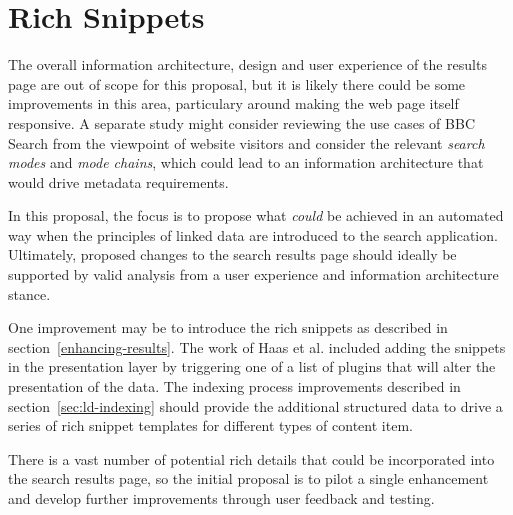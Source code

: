 \section{Rich Snippets}

The overall information architecture, design and user experience of
the results page are out of scope for this proposal, but it is likely
there could be some improvements in this area, particulary around making
the web page itself responsive\cite{marcotte2010responsive}. A separate
study might consider reviewing the use cases of BBC Search from
the viewpoint of website visitors and consider the relevant
\emph{search modes} and \emph{mode chains}, which could lead to
an information architecture that would drive metadata requirements.

In this proposal, the focus is to propose what \emph{could} be
achieved in an automated way when the principles of linked data
are introduced to the search application. Ultimately, proposed
changes to the search results page should ideally be supported
by valid analysis from a user experience and information
architecture stance.

One improvement may be to introduce the rich snippets as described
in section~\ref{enhancing-results}. The work of Haas et
al.\cite{haas2011enhanced} included adding the snippets in the presentation
layer by triggering one of a list of plugins that will alter the
presentation of the data. The indexing process improvements
described in section~\ref{sec:ld-indexing} should provide the
additional structured data to drive a series of rich snippet templates
for different types of content item.

There is a vast number of potential rich details that could be
incorporated into the search results page, so the initial proposal
is to pilot a single enhancement and develop further improvements
through user feedback and testing.

